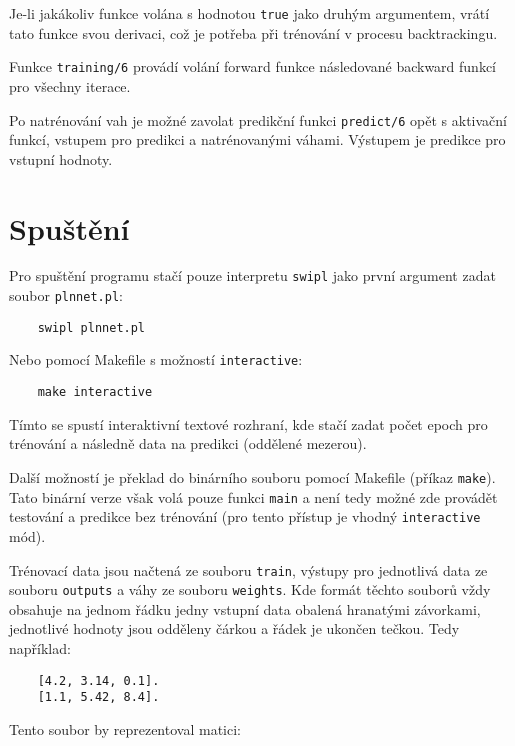 \documentclass[a4paper, 11pt]{article}
\begin{document}
\noindent Je-li jakákoliv funkce volána s hodnotou \texttt{true} jako druhým argumentem, vrátí tato funkce svou derivaci, což je potřeba při trénování v procesu backtrackingu.

Funkce \texttt{training/6} provádí volání forward funkce následované backward funkcí pro všechny iterace.

Po natrénování vah je možné zavolat predikční funkci \texttt{predict/6} opět s aktivační funkcí, vstupem pro predikci a natrénovanými váhami. Výstupem je predikce pro vstupní hodnoty.

\section{Spuštění}

Pro spuštění programu stačí pouze interpretu \texttt{swipl} jako první argument zadat soubor \texttt{plnnet.pl}:

\begin{verbatim}
    swipl plnnet.pl
\end{verbatim}

\noindent Nebo pomocí Makefile s možností \texttt{interactive}:

\begin{verbatim}
    make interactive
\end{verbatim}

Tímto se spustí interaktivní textové rozhraní, kde stačí zadat počet epoch pro trénování a následně data na predikci (oddělené mezerou).

Další možností je překlad do binárního souboru pomocí Makefile (příkaz \texttt{make}). Tato binární verze však volá pouze funkci \texttt{main} a není tedy možné zde provádět testování a predikce bez trénování (pro tento přístup je vhodný \texttt{interactive} mód).

Trénovací data jsou načtená ze souboru \texttt{train}, výstupy pro jednotlivá data ze souboru \texttt{outputs} a váhy ze souboru \texttt{weights}. Kde formát těchto souborů vždy obsahuje na jednom řádku jedny vstupní data obalená hranatými závorkami, jednotlivé hodnoty jsou odděleny čárkou a řádek je ukončen tečkou. Tedy například:

\begin{verbatim}
    [4.2, 3.14, 0.1].
    [1.1, 5.42, 8.4].
\end{verbatim}

\noindent Tento soubor by reprezentoval matici:
\\
\end{document}

